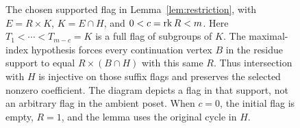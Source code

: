 \begin{figure}[ht]
\centering
{}
\caption{The chosen supported flag in Lemma~\ref{lem:restriction}, with
$E=R\times K$, $K=E\cap H$, and $0<c=\operatorname{rk} R<m$.
Here $T_1<\cdots<T_{m-c}=K$ is a full flag of subgroups of $K$.
The maximal-index hypothesis forces every continuation vertex $B$ in
the residue support to equal $R\times(B\cap H)$ with this same $R$.
Thus intersection with $H$ is injective on those suffix flags and
preserves the selected nonzero coefficient. The diagram depicts a
flag in that support, not an arbitrary flag in the ambient poset.
When $c=0$, the initial flag is empty, $R=1$, and the lemma uses the
original cycle in $H$.}
\label{fig:fixed-complement}
\end{figure}
